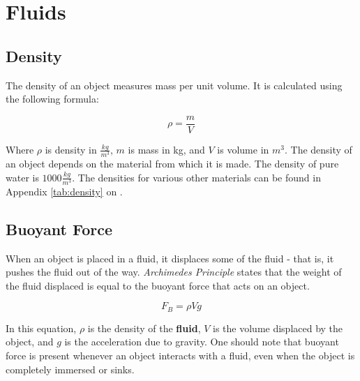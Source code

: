 \chapter{Fluids}
	\section{Density}
	The density of an object measures mass per unit volume.  It is calculated using the following formula:
		\begin{mdframed}[backgroundcolor=orange!20!white]
		\begin{equation}
		\rho = \frac{m}{V}
			\label{equation:density}
		\end{equation}
	\end{mdframed}	
	Where $\rho$ is density in $\frac{kg}{m^3}$, $m$ is mass in kg, and $V$ is volume in $m^3$.  The density of an object depends on the material from which it is made.  The density of pure water is $1000 \frac{kg}{m^3}$. The densities for various other materials can be found in Appendix \ref{tab:density} on  .
	
	\section{Buoyant Force}
	
	When an object is placed in a fluid, it displaces some of the fluid - that is, it pushes the fluid out of the way.  \textit{Archimedes Principle}  states that the weight of the fluid displaced is equal to the buoyant force that acts on an object.  
			\begin{mdframed}[backgroundcolor=orange!20!white]
		\begin{equation}
			F_B = \rho V g
			\label{equation:buoyantforce}
		\end{equation}
	\end{mdframed}	
In this equation, $\rho$ is the density of the \textbf{fluid}, $V$ is the volume displaced by the object, and $g$ is the acceleration due to gravity.  One should note that buoyant force is present whenever an object interacts with a fluid, even when the object is completely immersed or sinks.


